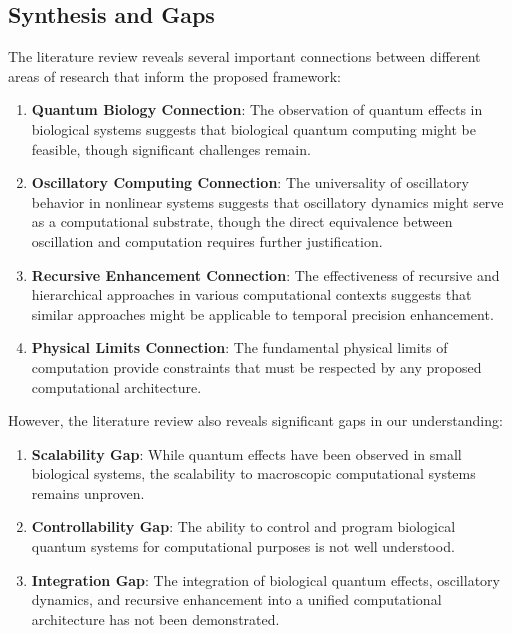 \documentclass[12pt,a4paper]{article}
\theoremstyle{definition}
\begin{document}
{\subsection{Synthesis and Gaps}

The literature review reveals several important connections between different areas of research that inform the proposed framework:

\begin{enumerate}
\item \textbf{Quantum Biology Connection}: The observation of quantum effects in biological systems suggests that biological quantum computing might be feasible, though significant challenges remain.

\item \textbf{Oscillatory Computing Connection}: The universality of oscillatory behavior in nonlinear systems suggests that oscillatory dynamics might serve as a computational substrate, though the direct equivalence between oscillation and computation requires further justification.

\item \textbf{Recursive Enhancement Connection}: The effectiveness of recursive and hierarchical approaches in various computational contexts suggests that similar approaches might be applicable to temporal precision enhancement.

\item \textbf{Physical Limits Connection}: The fundamental physical limits of computation provide constraints that must be respected by any proposed computational architecture.
\end{enumerate}

However, the literature review also reveals significant gaps in our understanding:

\begin{enumerate}
\item \textbf{Scalability Gap}: While quantum effects have been observed in small biological systems, the scalability to macroscopic computational systems remains unproven.

\item \textbf{Controllability Gap}: The ability to control and program biological quantum systems for computational purposes is not well understood.

\item \textbf{Integration Gap}: The integration of biological quantum effects, oscillatory dynamics, and recursive enhancement into a unified computational architecture has not been demonstrated.


\end{enumerate}}
\end{document}
